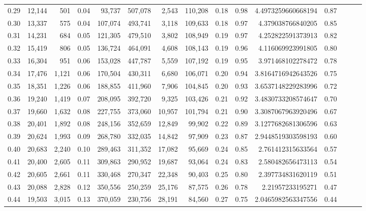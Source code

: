 \begin{tabular}{rrrrrrrrrrrrrrr}
0.29 &  12,144 &    501 &  0.04 &   93,737 &  507,078 &    2,543 &  110,208 &  0.18 &  0.98 &      4.4973259660668194 &      0.87 \\
0.30 &  13,337 &    575 &  0.04 &  107,074 &  493,741 &    3,118 &  109,633 &  0.18 &  0.97 &       4.379038766840205 &      0.85 \\
0.31 &  14,231 &    684 &  0.05 &  121,305 &  479,510 &    3,802 &  108,949 &  0.19 &  0.97 &       4.252822591373913 &      0.82 \\
0.32 &  15,419 &    806 &  0.05 &  136,724 &  464,091 &    4,608 &  108,143 &  0.19 &  0.96 &       4.116069923991805 &      0.80 \\
0.33 &  16,304 &    951 &  0.06 &  153,028 &  447,787 &    5,559 &  107,192 &  0.19 &  0.95 &       3.971468102278472 &      0.78 \\
0.34 &  17,476 &  1,121 &  0.06 &  170,504 &  430,311 &    6,680 &  106,071 &  0.20 &  0.94 &      3.8164716942643526 &      0.75 \\
0.35 &  18,351 &  1,226 &  0.06 &  188,855 &  411,960 &    7,906 &  104,845 &  0.20 &  0.93 &      3.6537148229283996 &      0.72 \\
0.36 &  19,240 &  1,419 &  0.07 &  208,095 &  392,720 &    9,325 &  103,426 &  0.21 &  0.92 &      3.4830733208574647 &      0.70 \\
0.37 &  19,660 &  1,632 &  0.08 &  227,755 &  373,060 &   10,957 &  101,794 &  0.21 &  0.90 &      3.3087067963920496 &      0.67 \\
0.38 &  20,401 &  1,892 &  0.08 &  248,156 &  352,659 &   12,849 &   99,902 &  0.22 &  0.89 &      3.1277682681306596 &      0.63 \\
0.39 &  20,624 &  1,993 &  0.09 &  268,780 &  332,035 &   14,842 &   97,909 &  0.23 &  0.87 &      2.9448519303598193 &      0.60 \\
0.40 &  20,683 &  2,240 &  0.10 &  289,463 &  311,352 &   17,082 &   95,669 &  0.24 &  0.85 &       2.761412315633564 &      0.57 \\
0.41 &  20,400 &  2,605 &  0.11 &  309,863 &  290,952 &   19,687 &   93,064 &  0.24 &  0.83 &       2.580482656473113 &      0.54 \\
0.42 &  20,605 &  2,661 &  0.11 &  330,468 &  270,347 &   22,348 &   90,403 &  0.25 &  0.80 &       2.397734831620119 &      0.51 \\
0.43 &  20,088 &  2,828 &  0.12 &  350,556 &  250,259 &   25,176 &   87,575 &  0.26 &  0.78 &        2.21957233195271 &      0.47 \\
0.44 &  19,503 &  3,015 &  0.13 &  370,059 &  230,756 &   28,191 &   84,560 &  0.27 &  0.75 &      2.0465982563347556 &      0.44 \\

\end{tabular}
